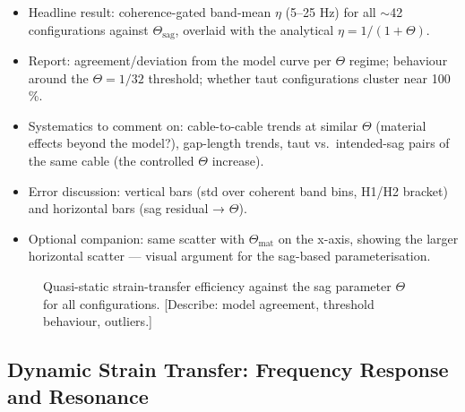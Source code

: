 \begin{itemize}
  \item Headline result: coherence-gated band-mean $\eta$ (5–25 Hz) for all
    $\sim$42 configurations against $\Theta_\mathrm{sag}$, overlaid with the
    analytical $\eta = 1/(1+\Theta)$.
  \item Report: agreement/deviation from the model curve per $\Theta$ regime;
    behaviour around the $\Theta = 1/32$ threshold; whether taut
    configurations cluster near 100\,\%.
  \item Systematics to comment on: cable-to-cable trends at similar $\Theta$
    (material effects beyond the model?), gap-length trends, taut vs.\
    intended-sag pairs of the same cable (the controlled $\Theta$ increase).
  \item Error discussion: vertical bars (std over coherent band bins,
    H1/H2 bracket) and horizontal bars (sag residual → $\Theta$).
  \item Optional companion: same scatter with $\Theta_\mathrm{mat}$ on the
    x-axis, showing the larger horizontal scatter — visual argument for the
    sag-based parameterisation.
\end{itemize}

\begin{figure}[htb]
  \centering
  \caption{Quasi-static strain-transfer efficiency against the sag parameter
    $\Theta$ for all configurations. [Describe: model agreement, threshold
    behaviour, outliers.]}
  \label{fig:res:etatheta}
\end{figure}

\subsection{Dynamic Strain Transfer: Frequency Response and Resonance}
\label{sec:res:dynamic}

